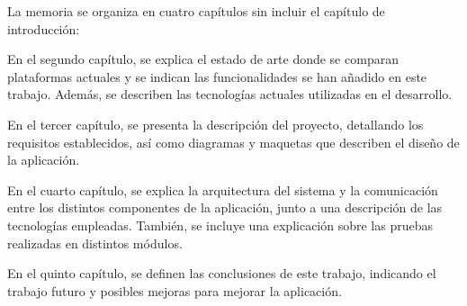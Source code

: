 La memoria se organiza en cuatro capítulos sin incluir el capítulo de introducción:
\begin{description}
    \item En el segundo capítulo, se explica el estado de arte donde se comparan plataformas actuales
    y se indican las funcionalidades se han añadido en este trabajo. Además, se describen las tecnologías 
    actuales utilizadas en el desarrollo. 
    
    \item En el tercer capítulo, se presenta la descripción del proyecto, detallando los requisitos establecidos,
    así como diagramas y maquetas que describen el diseño de la aplicación. 

    \item En el cuarto capítulo, se explica la arquitectura del sistema y la comunicación entre los distintos 
    componentes de la aplicación, junto a una descripción de las tecnologías empleadas. También, se incluye una
    explicación sobre las pruebas realizadas en distintos módulos.

    \item En el quinto capítulo, se definen las conclusiones de este trabajo, indicando el trabajo futuro y
    posibles mejoras para mejorar la aplicación.
     
\end{description}
